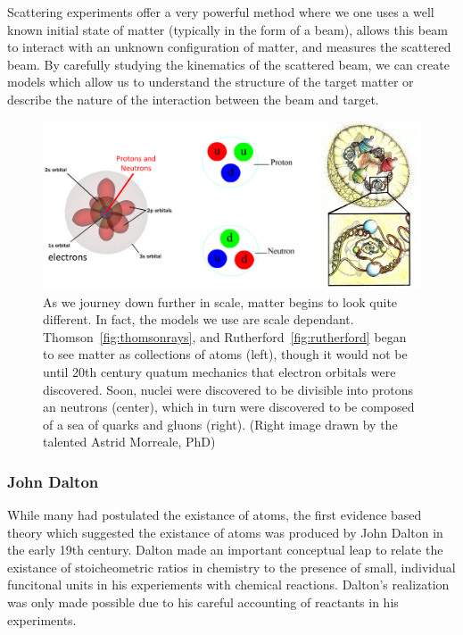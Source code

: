 Scattering experiments offer a very powerful method where we one uses a well
known initial state of matter (typically in the form of a beam), allows this
beam to interact with an unknown configuration of matter, and measures the
scattered beam. By carefully studying the kinematics of the scattered beam, we
can create models which allow us to understand the structure of the target
matter or describe the nature of the interaction between the beam and target. 

\begin{figure}[ht]
	\centering
	\includegraphics[width=\linewidth]{../Chapter2/fig/scale_of_matter.png}
	\caption{
		As we journey down further in scale, matter begins to look quite different.
		In fact, the models we use are scale dependant.
		Thomson~\ref{fig:thomsonrays}, and Rutherford~\ref{fig:rutherford} began to
		see matter as collections of atoms (left), though it would not be until 20th
		century quatum mechanics that electron orbitals were discovered. Soon,
		nuclei were discovered to be divisible into protons an neutrons (center),
		which in turn were discovered to be composed of a sea of quarks and gluons
		(right). (Right image drawn by the talented Astrid Morreale, PhD)
	}
	\label{fig:scale_of_matter}
\end{figure}

\subsubsection{John Dalton}

While many had postulated the existance of atoms, the first evidence based
theory which suggested the existance of atoms was produced by John Dalton in the
early 19th century. Dalton made an important conceptual leap to relate the
existance of stoicheometric ratios in chemistry to the presence of small,
individual funcitonal units in his experiements with chemical reactions.
Dalton's realization was only made possible due to his careful accounting of
reactants in his experiments.

